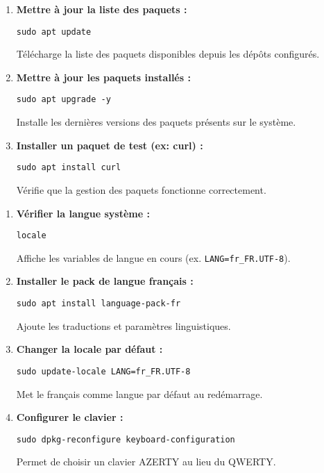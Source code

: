 \documentclass[11pt,a4paper]{article}
\begin{document}
\begin{tcolorbox}[title={3. Gestion des paquets et mises à jour}]
\begin{enumerate}
  \item \textbf{Mettre à jour la liste des paquets :}
\begin{verbatim}
sudo apt update
\end{verbatim}
Télécharge la liste des paquets disponibles depuis les dépôts configurés.

  \item \textbf{Mettre à jour les paquets installés :}
\begin{verbatim}
sudo apt upgrade -y
\end{verbatim}
Installe les dernières versions des paquets présents sur le système.

  \item \textbf{Installer un paquet de test (ex: curl) :}
\begin{verbatim}
sudo apt install curl
\end{verbatim}
Vérifie que la gestion des paquets fonctionne correctement.
\end{enumerate}
\end{tcolorbox}

\begin{tcolorbox}[title={4. Vérification des locales et du clavier}]
\begin{enumerate}
  \item \textbf{Vérifier la langue système :}
\begin{verbatim}
locale
\end{verbatim}
Affiche les variables de langue en cours (ex. \texttt{LANG=fr\_FR.UTF-8}).

  \item \textbf{Installer le pack de langue français :}
\begin{verbatim}
sudo apt install language-pack-fr
\end{verbatim}
Ajoute les traductions et paramètres linguistiques.

  \item \textbf{Changer la locale par défaut :}
\begin{verbatim}
sudo update-locale LANG=fr_FR.UTF-8
\end{verbatim}
Met le français comme langue par défaut au redémarrage.

  \item \textbf{Configurer le clavier :}
\begin{verbatim}
sudo dpkg-reconfigure keyboard-configuration
\end{verbatim}
Permet de choisir un clavier AZERTY au lieu du QWERTY.
\end{enumerate}
\end{tcolorbox}
\end{document}
